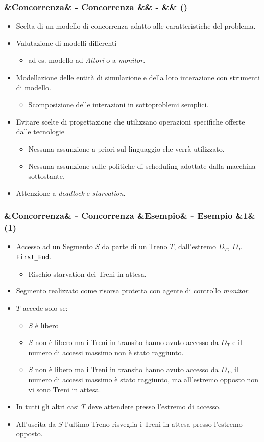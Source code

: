 \documentclass[slidestop,compress,blackandwhite]{beamer}
\newcommand{\ttt}[1]{\texttt{#1}}
\newcommand{\ii}[1]{\textit{#1}}
\newcommand{\newtitle}[4]{
	#1 
	\ifx&#2&%
	\else
  		\large- #2
	\fi
	\ifx&#3&%
	\else
  		\normalsize- #3
	\fi
	\ifx&#4&%
	\else
  		\normalsize (#4)
	\fi
}
\newcommand{\newframe}[5]{
	\begin{frame}
		\frametitle{\newtitle{#1}{#2}{#3}{#4}}
		#5
	\end{frame}
}
\newcommand{\myitemize}[1]{
	\begin{itemize}\itemsep4pt
	#1
	\end{itemize}
}
\begin{document}
	
	\newframe{}{Concorrenza}{}{}{
		\justifying
		\myitemize {
			\item Scelta di un modello di concorrenza adatto alle caratteristiche del problema.
			\item Valutazione di modelli differenti
				\myitemize{
					\item ad es. modello ad \ii{Attori} o a \ii{monitor}.
				}
			\item Modellazione delle entità di simulazione e della loro interazione con strumenti di modello.
				\myitemize {
					\item Scomposizione delle interazioni in sottoproblemi semplici.
				}
			\item Evitare scelte di progettazione che utilizzano operazioni specifiche offerte dalle tecnologie
				\myitemize {
					\item Nessuna assunzione a priori sul linguaggio che verrà utilizzato.
					\item Nessuna assunzione sulle politiche di scheduling adottate dalla macchina sottostante.
				}
			\item Attenzione a \ii{deadlock} e \ii{starvation}.
				
		}
		
	}
	
	\newframe{}{Concorrenza}{Esempio}{1}{
		\footnotesize
		\myitemize {
			\item Accesso ad un Segmento $S$ da parte di un Treno $T$, dall'estremo $D_T$, $D_T=$\ttt{ First\_End}.
				\myitemize {
					\item \footnotesize Rischio starvation dei Treni in attesa.
				}
			\item Segmento realizzato come risorsa protetta con agente di controllo \ii{monitor}.
			\item $T$ accede solo se:
				\myitemize{
					\item \footnotesize $S$ è libero
					\item $S$ non è libero ma i Treni in transito hanno avuto accesso da $D_T$ e il numero di accessi massimo non è stato raggiunto.
					\item $S$ non è libero ma i Treni in transito hanno avuto accesso da $D_T$, il numero di accessi massimo è stato raggiunto, ma all'estremo opposto non vi sono Treni in attesa.
				}
			\item In tutti gli altri casi $T$ deve attendere presso l'estremo di accesso.
			\item All'uscita da $S$ l'ultimo Treno risveglia i Treni in attesa presso l'estremo opposto.
		}	
	}
	
\end{document}
